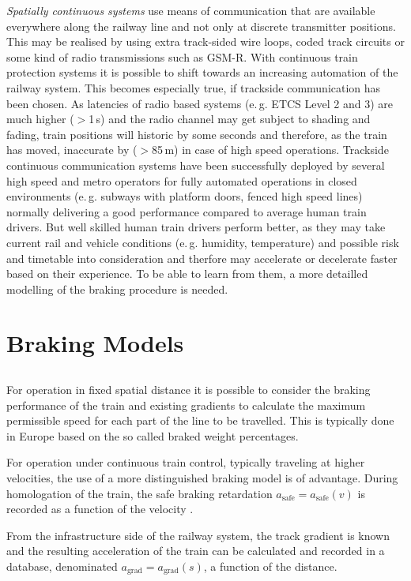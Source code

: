 \documentclass[a4paper, 12pt]{scrartcl}
\begin{document}
\noindent\emph{Spatially continuous systems} use means of communication that are available everywhere along the railway line and not only at discrete transmitter positions.
This may be realised by using extra track-sided wire loops, coded track circuits or some kind of radio transmissions such as GSM-R. With continuous train protection systems it is possible to shift towards an increasing automation of the railway system. This becomes especially true, if trackside communication has been chosen. As latencies of radio based systems (e.\,g. ETCS Level 2 and 3) are much higher ($>$1\,s) and the radio channel may get subject to shading and fading, train positions will historic by some seconds and therefore, as the train has moved, inaccurate by ($>$85\,m) in case of high speed operations. Trackside continuous communication systems have been successfully deployed by several high speed and metro operators for fully automated operations in closed environments (e.\,g. subways with platform doors, fenced high speed lines)
normally delivering a good performance compared to average human train drivers. But well skilled human train drivers perform better, as they may take current rail and vehicle conditions (e.\,g. humidity, temperature) and possible risk and timetable into consideration and therfore may accelerate or decelerate faster based on their experience. To be able to learn from them, a more detailled modelling of the braking procedure is needed.

\section{Braking Models}
\subsection{}
For operation in fixed spatial distance it is possible to consider the braking performance of the train and existing gradients to calculate the maximum permissible speed for each part of the line to be travelled. This is typically done in Europe based on the so called braked weight percentages. 

For operation under continuous train control, typically traveling at higher velocities, the use of a more distinguished braking model is of advantage. During homologation of the train, the safe braking retardation $a_{\text{safe}} = a_{\text{safe}}(v)$ is recorded as a function of the velocity \cite{gropler2008bremswege}.

From the infrastructure side of the railway system, the track gradient is known and the resulting acceleration of the train can be calculated and recorded in a database, denominated $a_{\text{grad}} = a_{\text{grad}}(s)$, a function of the distance.
\end{document}
